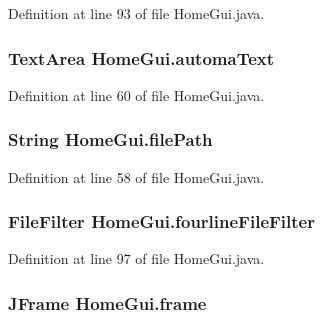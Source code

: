 Definition at line 93 of file Home\-Gui.\-java.

\hypertarget{class_home_gui_a6b00edbcb893105ddc5e3b2beb4c2dca}{
\subsubsection[{automa\-Text}]{\setlength{\rightskip}{0pt plus 5cm}Text\-Area {\bf Home\-Gui.\-automa\-Text}}}\label{class_home_gui_a6b00edbcb893105ddc5e3b2beb4c2dca}


Definition at line 60 of file Home\-Gui.\-java.

\hypertarget{class_home_gui_a1f9226407f1c2c6ff8d62f84dfcebfbe}{
\subsubsection[{file\-Path}]{\setlength{\rightskip}{0pt plus 5cm}String {\bf Home\-Gui.\-file\-Path}}}\label{class_home_gui_a1f9226407f1c2c6ff8d62f84dfcebfbe}


Definition at line 58 of file Home\-Gui.\-java.

\hypertarget{class_home_gui_a7f56e390a2982689b92cee117f50e987}{
\subsubsection[{fourline\-File\-Filter}]{\setlength{\rightskip}{0pt plus 5cm}File\-Filter {\bf Home\-Gui.\-fourline\-File\-Filter}}}\label{class_home_gui_a7f56e390a2982689b92cee117f50e987}


Definition at line 97 of file Home\-Gui.\-java.

\hypertarget{class_home_gui_a0b1781db25b8fdacc8970aa6166b11ad}{
\subsubsection[{frame}]{\setlength{\rightskip}{0pt plus 5cm}J\-Frame {\bf Home\-Gui.\-frame}}}\label{class_home_gui_a0b1781db25b8fdacc8970aa6166b11ad}


